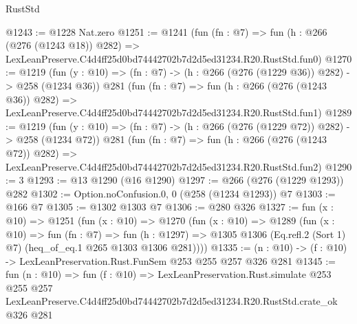 \begin{lexlean}{RustStd}
\begin{coremodule}
@1243 := @1228 Nat.zero
@1251 := @1241
    (fun (fn : @7) =>
    fun (h : @266 (@276 (@1243 @18)) @282) =>
    LexLeanPreserve.C4d4ff25d0bd74442702b7d2d5ed31234.R20.RustStd.fun0)
@1270 := @1219
    (fun (y : @10) => (fn : @7) -> (h : @266 (@276 (@1229 @36)) @282) -> @258 (@1234 @36))
    @281
    (fun (fn : @7) =>
    fun (h : @266 (@276 (@1243 @36)) @282) =>
    LexLeanPreserve.C4d4ff25d0bd74442702b7d2d5ed31234.R20.RustStd.fun1)
@1289 := @1219
    (fun (y : @10) => (fn : @7) -> (h : @266 (@276 (@1229 @72)) @282) -> @258 (@1234 @72))
    @281
    (fun (fn : @7) =>
    fun (h : @266 (@276 (@1243 @72)) @282) =>
    LexLeanPreserve.C4d4ff25d0bd74442702b7d2d5ed31234.R20.RustStd.fun2)
@1290 := 3
@1293 := @13 @1290 (@16 @1290)
@1297 := @266 (@276 (@1229 @1293)) @282
@1302 := Option.noConfusion.{0, 0} (@258 (@1234 @1293)) @7
@1303 := @166 @7
@1305 := @1302 @1303 @7
@1306 := @280 @326
@1327 := fun (x : @10) =>
  @1251
    (fun (x : @10) =>
    @1270
      (fun (x : @10) =>
      @1289
        (fun (x : @10) =>
        fun (fn : @7) =>
        fun (h : @1297) =>
        @1305 @1306 (Eq.refl.{2} (Sort 1) @7) (heq_of_eq.{1} @265 @1303 @1306 @281))))
@1335 := (n : @10) -> (f : @10) -> LexLeanPreservation.Rust.FunSem @253 @255 @257 @326 @281
@1345 := fun (n : @10) =>
  fun (f : @10) =>
  LexLeanPreservation.Rust.simulate
    @253
    @255
    @257
    LexLeanPreserve.C4d4ff25d0bd74442702b7d2d5ed31234.R20.RustStd.crate_ok
    @326
    @281
\end{coremodule}
\end{lexlean}
